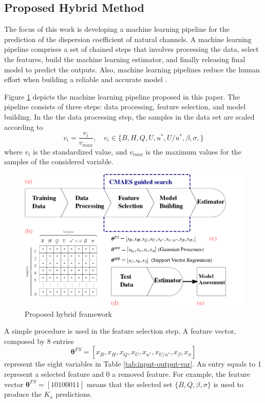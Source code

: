 \documentclass[a4paper,12pt, english]{article}
\newcommand{\xp}{\bm{\theta}}
\newcommand{\xfs}{\xp^{FS}}
\begin{document}
\subsection{\label{sec:methods:evofs} Proposed Hybrid Method}

The focus of this work is developing a machine learning pipeline for the prediction of the dispersion coefficient of natural channels. 
A machine learning pipeline comprises a set of chained steps that involves processing the data, select the features, build the machine learning estimator, and finally releasing final model to predict the outputs.
Also, machine learning pipelines reduce the human effort when building a reliable and accurate model \cite{liu:201748}.

Figure \ref{fig:framework} depicts the machine learning pipeline proposed in this paper.
The pipeline consists of three steps: data processing, feature selection, and model building.
% 
In the the data processing step, the samples in the data set are scaled according to
\[
 v_i = \frac{v_i}{v_{max}}, \quad
 v_i \in \{ {B}, {H}, {Q}, {U}, {u^*}, {U/u^*}, {\beta}, {\sigma}, \}
\]
where $v_i$ is the standardized value, and $v_{max}$  is the maximum values for the samples of the considered variable. 

\begin{figure}[!htb]
 \centering 
 \includegraphics[width=0.85\linewidth]{./framework/ldc_model_scheme}
 \caption{Proposed hybrid framework}
 \label{fig:framework}
\end{figure}

A simple procedure is used in the feature selection step. A feature vector, composed by 8 entries
\[ \xfs = [ x_{B}, x_{H}, x_{Q}, x_{U}, x_{u^*}, x_{U/u^*}, x_{\beta}, x_{\sigma}]\]
represent the eight variables in Table \ref{tab:input-output-var}.
An  entry equals to 1 represent a selected feature and 0 a removed feature. For example, the feature vector $ \xfs = [10100011] $ means that the selected set $\{B, Q, \beta, \sigma \}$ is used to produce the $K_x$ predictions.
\end{document}
